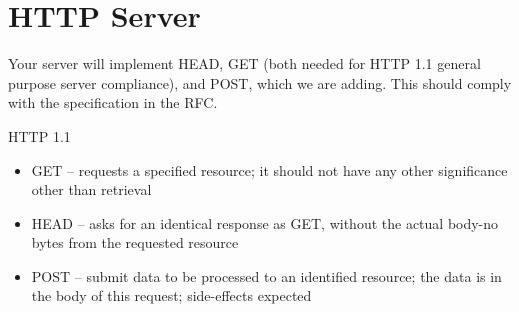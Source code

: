 \documentclass[12pt]{article}
\begin{document}
\section{HTTP Server}

Your server will implement HEAD, GET (both needed for HTTP 1.1 general purpose server compliance), and POST, which we are adding. This should comply with the specification in the RFC.

HTTP 1.1
\begin{itemize}
\item  GET – requests a specified resource; it should not have any other significance other
than retrieval
\item  HEAD – asks for an identical response as GET, without the actual body-no bytes from the requested resource
\item  POST – submit data to be processed to an identified resource; the data is in the body of this request; side-effects expected
\end{itemize}
\end{document}
